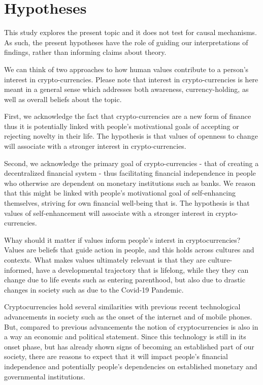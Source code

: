 \documentclass[doc]{apa7}
\begin{document}
\hypertarget{hypotheses}{%
\section{Hypotheses}\label{hypotheses}}

This study explores the present topic and it does not test for causal
mechanisms. As such, the present hypotheses have the role of guiding our
interpretations of findings, rather than informing claims about theory.

We can think of two approaches to how human values contribute to a
person's interest in crypto-currencies. Please note that interest in
crypto-currencies is here meant in a general sense which addresses both
awareness, currency-holding, as well as overall beliefs about the topic.

First, we acknowledge the fact that crypto-currencies are a new form of
finance thus it is potentially linked with people's motivational goals
of accepting or rejecting novelty in their life. The hypothesis is that
values of openness to change will associate with a stronger interest in
crypto-currencies.

Second, we acknowledge the primary goal of crypto-currencies - that of
creating a decentralized financial system - thus facilitating financial
independence in people who otherwise are dependent on monetary
institutions such as banks. We reason that this might be linked with
people's motivational goal of self-enhancing themselves, striving for
own financial well-being that is. The hypothesis is that values of
self-enhancement will associate with a stronger interest in
crypto-currencies.

Whay should it matter if values inform people's interst in
cryptocurrencies? Values are beliefs that guide action in people, and
this holds across cultures and contexts. What makes values ultimately
relevant is that they are culture-informed, have a developmental
trajectory that is lifelong, while they they can change due to life
events such as entering parenthood, but also due to drastic changes in
society such as due to the Covid-19 Pandemic.

Cryptocurrencies hold several similarities with previous recent
technological advancements in society such as the onset of the internet
and of mobile phones. But, compared to previous advancements the notion
of cryptocurrencies is also in a way an economic and political
statement. Since this technology is still in its onset phase, but has
already shown signs of becoming an established part of our society,
there are reasons to expect that it will impact people's financial
independence and potentially people's dependencies on established
monetary and governmental institutions.
\end{document}
